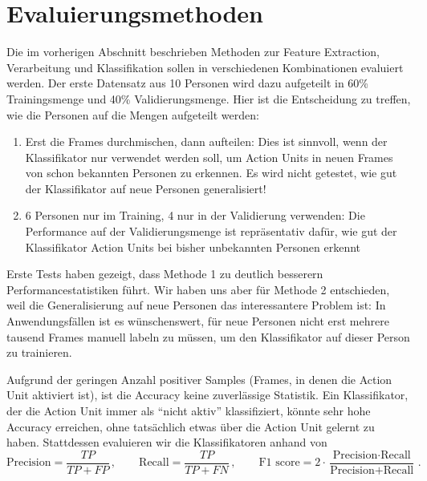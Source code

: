 \section{Evaluierungsmethoden}
Die im vorherigen Abschnitt beschrieben Methoden zur Feature Extraction,
Verarbeitung und Klassifikation sollen in verschiedenen Kombinationen evaluiert
werden. Der erste Datensatz aus 10 Personen wird dazu aufgeteilt in 60\%
Trainingsmenge und 40\% Validierungsmenge. Hier ist die Entscheidung zu treffen,
wie die Personen auf die Mengen aufgeteilt werden:
\begin{enumerate}
\item Erst die Frames durchmischen, dann aufteilen: Dies ist sinnvoll, wenn der
  Klassifikator nur verwendet werden soll, um Action Units in neuen Frames von schon bekannten
  Personen zu erkennen. Es wird nicht getestet, wie gut der Klassifikator auf
  neue Personen generalisiert!
  \item 6 Personen nur im Training, 4 nur in der Validierung verwenden: Die
    Performance auf der Validierungsmenge ist repräsentativ dafür, wie gut der
    Klassifikator Action Units bei bisher unbekannten Personen erkennt
\end{enumerate}
Erste Tests haben gezeigt, dass Methode 1 zu deutlich besserern
Performancestatistiken führt. Wir haben uns aber für Methode 2 entschieden, weil
die Generalisierung auf neue Personen das interessantere Problem ist: In
Anwendungsfällen ist es wünschenswert, für neue Personen nicht erst mehrere
tausend Frames manuell labeln zu müssen, um den Klassifikator auf dieser Person
zu trainieren.

Aufgrund der geringen Anzahl positiver Samples (Frames, in denen die Action Unit
aktiviert ist), ist die Accuracy keine zuverlässige Statistik. Ein Klassifikator,
der die Action Unit immer als ``nicht aktiv'' klassifiziert, könnte sehr hohe
Accuracy erreichen, ohne tatsächlich etwas über die Action Unit gelernt zu haben.
Stattdessen evaluieren wir die Klassifikatoren anhand von 
\begin{equation*}
\text{Precision}=\frac{TP}{TP+FP}\,, \qquad \text{Recall}=\frac{TP}{TP+FN}\,, \qquad \text{F1 score}=2\cdot\frac{\text{Precision}\cdot\text{Recall}}{\text{Precision}+\text{Recall}}\,.
\end{equation*}

